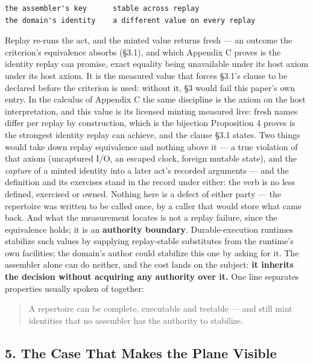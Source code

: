 \documentclass[
]{article}
\begin{document}
\begin{verbatim}
the assembler's key      stable across replay
the domain's identity    a different value on every replay
\end{verbatim}

Replay re-runs the act, and the minted value returns fresh --- an
outcome the criterion's equivalence absorbs (§3.1), and which Appendix C
proves is the identity replay can promise, exact equality being
unavailable under its host axiom under its host axiom. It is the
measured value that forces §3.1's clause to be declared before the
criterion is used: without it, §3 would fail this paper's own entry. In
the calculus of Appendix C the same discipline is the axiom on the host
interpretation, and this value is its licensed minting measured live:
fresh names differ per replay by construction, which is the bijection
Proposition 4 proves is the strongest identity replay can achieve, and
the clause §3.1 states. Two things would take down replay equivalence
and nothing above it --- a true violation of that axiom (uncaptured I/O,
an escaped clock, foreign mutable state), and the \emph{capture} of a
minted identity into a later act's recorded arguments --- and the
definition and its exercises stand in the record under either: the verb
is no less defined, exercised or owned. Nothing here is a defect of
either party --- the repertoire was written to be called once, by a
caller that would store what came back. And what the measurement locates
is not a replay failure, since the equivalence holds; it is an
\textbf{authority boundary}. Durable-execution runtimes stabilize such
values by supplying replay-stable substitutes from the runtime's own
facilities; the domain's author could stabilize this one by asking for
it. The assembler alone can do neither, and the cost lands on the
subject: \textbf{it inherits the decision without acquiring any
authority over it.} One line separates properties usually spoken of
together:

\begin{quote}
A repertoire can be complete, executable and testable --- and still mint
identities that no assembler has the authority to stabilize.
\end{quote}

\subsection{5. The Case That Makes the Plane
Visible}\label{the-case-that-makes-the-plane-visible}
\end{document}
